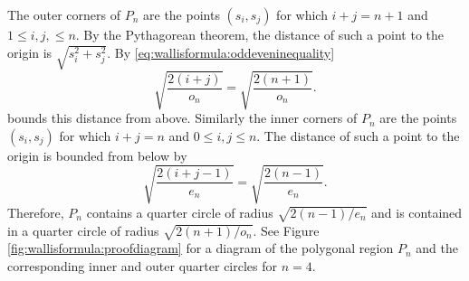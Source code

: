 \documentclass[12pt]{article}
\begin{document}
The outer corners of \( P_n \) are the points \( (s_i, s_j) \) for which
\( i + j = n+1 \) and \( 1 \le i,j, \le n \).  By the Pythagorean
theorem, the distance of such a point to the origin is \( \sqrt{s_i^2 +
s_j^2} \).  By \eqref{eq:wallisformula:oddeveninequality}
\[
    \sqrt{ \frac{2(i+j)}{o_n} } = \sqrt{ \frac{2(n+1)}{o_n} }.
\] bounds this distance from above.  Similarly the inner corners of \( P_n
\) are the points \( ( s_i,s_j) \) for which \( i + j = n \) and \( 0
\le i,j \le n \).  The distance of such a point to the origin is bounded
from below by
\[
    \sqrt{ \frac{2(i+j-1)}{e_n} } = \sqrt{ \frac{2(n-1)}{e_n} }.
\] Therefore, \( P_n \) contains a quarter circle of radius \( \sqrt{2(n-1)/e_n}
\) and is contained in a quarter circle of radius \( \sqrt{2(n+1)/o_n} \).
See Figure~%
\ref{fig:wallisformula:proofdiagram} for a diagram of the polygonal
region \( P_n \) and the corresponding inner and outer quarter circles
for \( n = 4 \).
\end{document}
